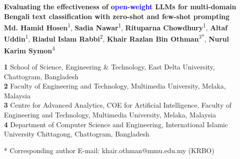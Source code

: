 \documentclass[10pt,letterpaper]{article}
\newcommand{\rev}[1]{\textcolor{blue}{#1}}
\begin{document}
\vspace*{0.2in}

\begin{flushleft}
{\Large
\textbf{Evaluating the effectiveness of \rev{open-weight} LLMs for multi-domain Bengali text classification with zero-shot and few-shot prompting}
}
\newline
\\
\textbf{Md. Hamid Hosen}\textsuperscript{1},
\textbf{Sadia Nawar}\textsuperscript{1},
\textbf{Rituparna Chowdhury}\textsuperscript{1},
\textbf{Altaf Uddin}\textsuperscript{1},
\textbf{Riadul Islam Rabbi}\textsuperscript{2},
\textbf{Khair Razlan Bin Othman}\textsuperscript{3*},
\textbf{Nurul Karim Symon}\textsuperscript{4}
\\
\bigskip

\textbf{1} School of Science, Engineering \& Technology, East Delta University, Chattogram, Bangladesh
\\
\textbf{2} Faculty of Engineering and Technology, Multimedia University, Melaka, Malaysia
\\
\textbf{3} Centre for Advanced Analytics, COE for Artificial Intelligence, Faculty of Engineering and Technology, Multimedia University, Melaka, Malaysia
\\
\textbf{4} Department of Computer Science and Engineering, International Islamic University Chittagong, Chattogram, Bangladesh
\\
\bigskip

* Corresponding author
E-mail: khair.othman@mmu.edu.my (KRBO)

\end{flushleft}
\end{document}
